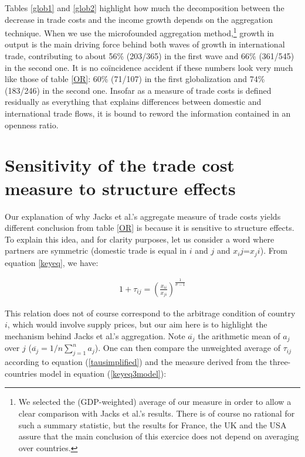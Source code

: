\documentclass{article}
\begin{document}
Tables \ref{glob1} and \ref{glob2} highlight how much the decomposition
between the decrease in trade costs and the income growth depends on the aggregation technique. When we use the microfounded aggregation method,\footnote{We selected the (GDP-weighted) average of our measure in order
to allow a clear comparison with Jacks et al.'s results. There
is of course no rational for such a summary statistic, but the
results for France, the UK and the USA assure that the main
conclusion of this exercice does not depend on averaging over
countries.} 
growth in output is the main driving force behind both waves of growth in
international trade, contributing to about 56\% (203/365) in
the first wave and 66\% (361/545) in the second one. It is no coïncidence
accident if these numbers look very much like those of table \ref{OR}: 60\% (71/107) in the first globalization and 74\% (183/246) in the second one.
Insofar as a measure of
trade costs is defined residually as everything that explains
differences between domestic and international trade flows, it
is bound to reword the information contained in an openness
ratio.

\section{\label{3} Sensitivity of the trade cost measure to
structure effects}

Our explanation of why Jacks et al.'s aggregate measure of
trade costs yields different conclusion 
from table \ref{OR} is because it is sensitive to structure
effects. To explain this idea, and for clarity purposes, let us consider
a word where partners are symmetric (domestic trade is equal in $i$ and $j$ and $x_ij$=$x_ji$). From equation \ref{keyeq}, we have:

\begin{eqnarray}
1+\tau_{ij}= \left(\frac{x_{ii}}{x_{ji}}\right)^{\frac{1}{\sigma-1}}\label{tausimplified}
\end{eqnarray}

This relation does not of course correspond to the arbitrage
condition of country $i$, which would involve supply prices,
but our aim here is to highlight the mechanism behind Jacks et
al.'s aggregation. Note $\overline{a_j}$ the arithmetic mean
of $a_j$ over $j$ ($\overline{a_j}=1/n \sum_{j=1}^{n}a_j$). One can
then compare the unweighted average of $\tau_{ij}$ according to equation 
(\ref{tausimplified}) and the measure derived from the
three-countries model in equation (\ref{keyeq3model}):
\end{document}

